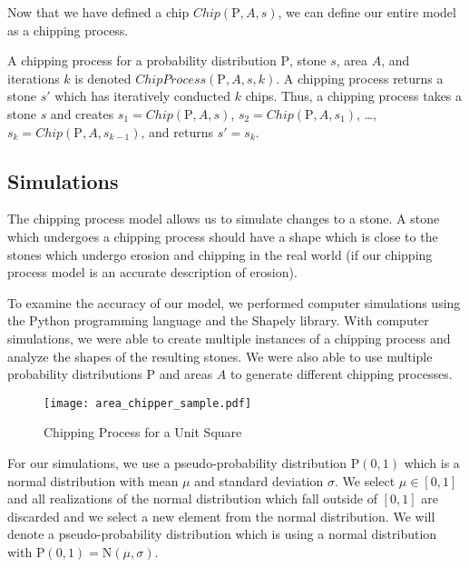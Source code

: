 Now that we have defined a chip $Chip(\mathrm{P}, A, s)$, we can define our entire model as a chipping process.

\begin{definition}
A chipping process for a probability distribution $\mathrm{P}$, stone $s$, area $A$, and iterations $k$ is denoted $ChipProcess(\mathrm{P}, A, s, k)$. A chipping process returns a stone $s'$ which has iteratively conducted $k$ chips. Thus, a chipping process takes a stone $s$ and creates $s_1 = Chip(\mathrm{P}, A, s)$, $s_2 = Chip(\mathrm{P}, A, s_1)$, \ldots, $s_k = Chip(\mathrm{P}, A, s_{k-1})$, and returns $s' = s_k$.
\end{definition}

\subsection{Simulations}

The chipping process model allows us to simulate changes to a stone. A stone which undergoes a chipping process should have a shape which is close to the stones which undergo erosion and chipping in the real world (if our chipping process model is an accurate description of erosion).

To examine the accuracy of our model, we performed computer simulations using the Python programming language and the Shapely library. With computer simulations, we were able to create multiple instances of a chipping process and analyze the shapes of the resulting stones. We were also able to use multiple probability distributions $\mathrm{P}$ and areas $A$ to generate different chipping processes.

\begin{figure}
  \begin{center}
    \texttt{[image: area\_chipper\_sample.pdf]}
  \end{center}
  \caption{Chipping Process for a Unit Square \label{fig:area_chipper_sample}}
\end{figure}


For our simulations, we use a pseudo-probability distribution $\mathrm{P}(0,1)$ which is a normal distribution with mean $\mu$ and standard deviation $\sigma$. We select $\mu \in [0,1]$ and all realizations of the normal distribution which fall outside of $[0,1]$ are discarded and we select a new element from the normal distribution. We will denote a pseudo-probability distribution which is using a normal distribution with $\mathrm{P}(0,1) = \mathrm{N}(\mu, \sigma)$.

